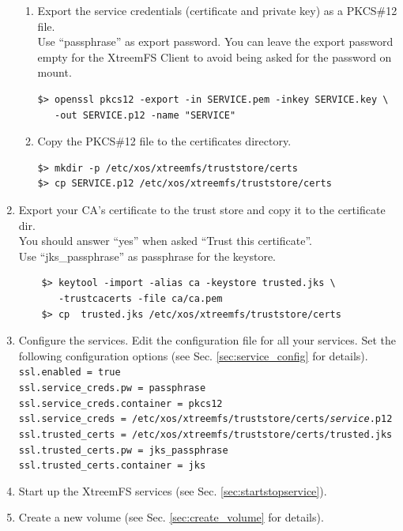 \documentclass[a4paper,10pt]{book}
\begin{document}
\begin{enumerate}
\begin{enumerate}
	\item Export the service credentials (certificate and private key) as a PKCS\#12 file.\\
		Use ``passphrase'' as export password. You can leave the export password empty for the XtreemFS Client to avoid being asked for the password on mount.
		\begin{verbatim}
$> openssl pkcs12 -export -in SERVICE.pem -inkey SERVICE.key \
   -out SERVICE.p12 -name "SERVICE"
		\end{verbatim}

	\item Copy the PKCS\#12 file to the certificates directory.
		\begin{verbatim}
$> mkdir -p /etc/xos/xtreemfs/truststore/certs
$> cp SERVICE.p12 /etc/xos/xtreemfs/truststore/certs
		\end{verbatim}

	\end{enumerate}
 \item Export your CA's certificate to the trust store and copy it to the certificate dir.\\
	You should answer ``yes'' when asked ``Trust this certificate''.\\
	Use ``jks\_passphrase'' as passphrase for the keystore.
	\begin{verbatim}
	$> keytool -import -alias ca -keystore trusted.jks \
	   -trustcacerts -file ca/ca.pem
	$> cp  trusted.jks /etc/xos/xtreemfs/truststore/certs
	\end{verbatim}

 \item Configure the services.
	Edit the configuration file for all your services. Set the following configuration options (see Sec. \ref{sec:service_config} for details).\\
	\texttt{ssl.enabled = true}\\
	\texttt{ssl.service\_creds.pw = passphrase}\\
	\texttt{ssl.service\_creds.container = pkcs12}\\
	\texttt{ssl.service\_creds = /etc/xos/xtreemfs/truststore/certs/\textit{service}.p12}\\
	\texttt{ssl.trusted\_certs = /etc/xos/xtreemfs/truststore/certs/trusted.jks}\\
	\texttt{ssl.trusted\_certs.pw = jks\_passphrase}\\
	\texttt{ssl.trusted\_certs.container = jks}
 \item Start up the XtreemFS services (see Sec. \ref{sec:startstopservice}).
 \item Create a new volume (see Sec. \ref{sec:create_volume} for details).


\end{enumerate}
\end{document}
